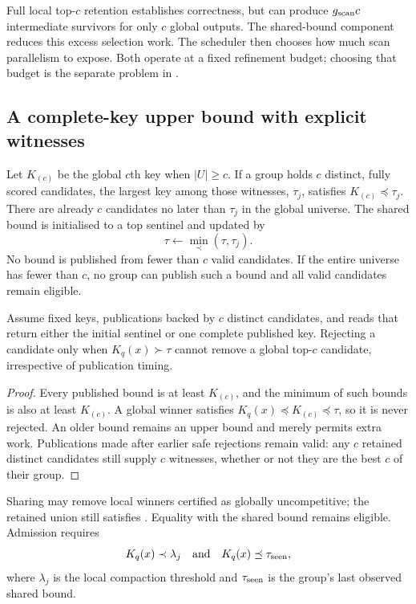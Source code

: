 Full local top-$c$ retention establishes correctness, but can produce
$g_{\mathrm{scan}} c$ intermediate survivors for only $c$ global outputs. The shared-bound
component reduces this excess selection work. The scheduler
then chooses how much scan parallelism to expose. Both operate at a fixed
refinement budget; choosing that budget is the separate problem in
.

\subsection{A complete-key upper bound with explicit witnesses}

Let $K_{(c)}$ be the global $c$th key when $|U|\geq c$. If a group holds
$c$ distinct, fully scored candidates, the largest key among those
witnesses, $\tau_j$, satisfies $K_{(c)}\preceq\tau_j$. There are already
$c$ candidates no later than $\tau_j$ in the global universe. The shared
bound is initialised to a top sentinel and updated by
\begin{equation}
 \tau\leftarrow\min_{\prec}(\tau,\tau_j).
 \label{eq:5-shared-update}
\end{equation}
No bound is published from fewer than $c$ valid candidates. If the entire
universe has fewer than $c$, no group can publish such a bound and all
valid candidates remain eligible.

\begin{resultblock}
\begin{proposition}
\label{prop:5-shared-bound}
Assume fixed keys, publications backed by $c$ distinct candidates, and
reads that return either the initial sentinel or one complete published
key. Rejecting a candidate only when $K_q(x)\succ\tau$ cannot remove a
global top-$c$ candidate, irrespective of publication timing.
\end{proposition}
\begin{proof}
Every published bound is at least $K_{(c)}$, and the minimum of such
bounds is also at least $K_{(c)}$. A global winner satisfies
$K_q(x)\preceq K_{(c)}\preceq\tau$, so it is never rejected. An older
bound remains an upper bound and merely permits extra work. Publications
made after earlier safe rejections remain valid: any $c$ retained
distinct candidates still supply $c$ witnesses, whether or not they are
the best $c$ of their group.
\end{proof}
\end{resultblock}

Sharing may remove local winners certified as globally uncompetitive;
the retained union still satisfies .
Equality with the shared bound remains eligible. Admission requires
\begin{equation}
 K_q(x)\prec\lambda_j
 \quad\text{and}\quad
 K_q(x)\preceq\tau_{\rm seen},
 \label{eq:5-admission}
\end{equation}
where $\lambda_j$ is the local compaction threshold and
$\tau_{\rm seen}$ is the group's last observed shared bound.

